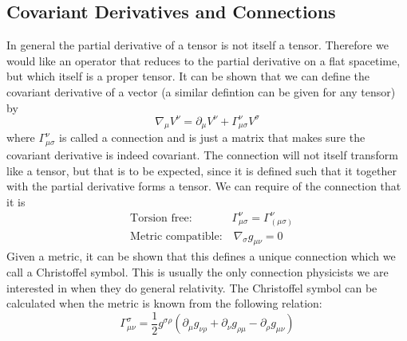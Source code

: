\subsection{Covariant Derivatives and Connections}
\thispagestyle{empty}
In general the partial derivative of a tensor is not itself a tensor. Therefore we would like an operator that reduces to the partial derivative on a flat spacetime, but which itself is a proper tensor. It can be shown that we can define the covariant derivative of a vector (a similar defintion can be given for any tensor) by
\begin{equation}
\nabla_\mu V^\nu = \partial_\mu V^\nu + \Gamma^\nu_{\mu \sigma} V^\sigma
\end{equation} 
where $\Gamma^\nu_{\mu \sigma}$ is called a connection and is just a matrix that makes sure the covariant derivative is indeed covariant. The connection will not itself transform like a tensor, but that is to be expected, since it is defined such that it together with the partial derivative forms a tensor. We can require of the connection that it is
%
%
\begin{align}
& \text{Torsion free:} \qquad \quad \; \; \Gamma^\nu_{\mu \sigma} = \Gamma^\nu_{(\mu \sigma)}
\\
& \text{Metric compatible:} \quad \nabla_\sigma g_{\mu \nu} = 0
\end{align}
%
%
Given a metric, it can be shown that this defines a unique connection which we call a Christoffel symbol. This is usually the only connection physicists we are interested in when they do general relativity. The Christoffel symbol can be calculated when the metric is known from the following relation:
\begin{equation}
\Gamma^\sigma_{\mu \nu} = \frac{1}{2} g^{\sigma \rho} (
\partial_\mu g_{\nu \rho} + \partial_\nu g_{\rho \mu} - \partial_\rho g_{\mu \nu} )
\end{equation}


